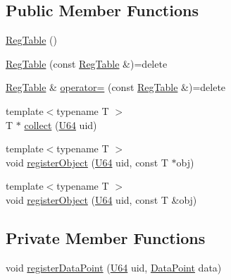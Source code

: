 \subsection*{Public Member Functions}
\begin{DoxyCompactItemize}
\item 
\hyperlink{classpcs_1_1Util_1_1Mem_1_1RegTable_abf5ce566d2af0fa1267ff19e24bf8912}{Reg\+Table} ()
\item 
\hyperlink{classpcs_1_1Util_1_1Mem_1_1RegTable_a665bb13c8159497d6ccf30aefb525681}{Reg\+Table} (const \hyperlink{classpcs_1_1Util_1_1Mem_1_1RegTable}{Reg\+Table} \&)=delete
\item 
\hyperlink{classpcs_1_1Util_1_1Mem_1_1RegTable}{Reg\+Table} \& \hyperlink{classpcs_1_1Util_1_1Mem_1_1RegTable_ae4147c2cb9b26272879b73330eba0908}{operator=} (const \hyperlink{classpcs_1_1Util_1_1Mem_1_1RegTable}{Reg\+Table} \&)=delete
\item 
{\footnotesize template$<$typename T $>$ }\\T $\ast$ \hyperlink{classpcs_1_1Util_1_1Mem_1_1RegTable_ae343c69786a6b7fcfdff6d311a18c50f}{collect} (\hyperlink{namespacepcs_1_1Util_1_1Mem_ab390aefcd13d26db4db397b784b4b9c6}{U64} uid)
\item 
{\footnotesize template$<$typename T $>$ }\\void \hyperlink{classpcs_1_1Util_1_1Mem_1_1RegTable_a3e527aef5808d02522f2e1ab27fb6947}{register\+Object} (\hyperlink{namespacepcs_1_1Util_1_1Mem_ab390aefcd13d26db4db397b784b4b9c6}{U64} uid, const T $\ast$obj)
\item 
{\footnotesize template$<$typename T $>$ }\\void \hyperlink{classpcs_1_1Util_1_1Mem_1_1RegTable_a7a6caf2a5c20e8b28a8f454cc91aa96e}{register\+Object} (\hyperlink{namespacepcs_1_1Util_1_1Mem_ab390aefcd13d26db4db397b784b4b9c6}{U64} uid, const T \&obj)
\end{DoxyCompactItemize}
\subsection*{Private Member Functions}
\begin{DoxyCompactItemize}
\item 
void \hyperlink{classpcs_1_1Util_1_1Mem_1_1RegTable_acd1220bca68b300651daccd808140707}{register\+Data\+Point} (\hyperlink{namespacepcs_1_1Util_1_1Mem_ab390aefcd13d26db4db397b784b4b9c6}{U64} uid, \hyperlink{structpcs_1_1Util_1_1Mem_1_1DataPoint}{Data\+Point} data)
\end{DoxyCompactItemize}
